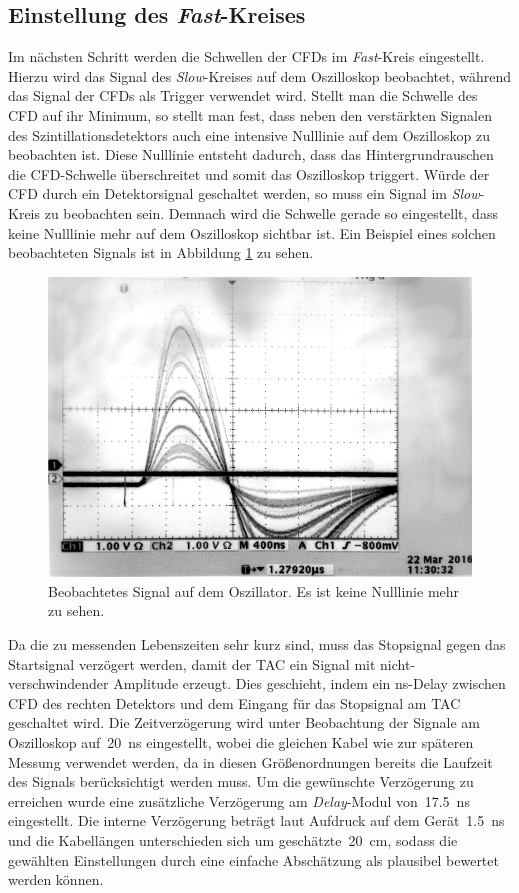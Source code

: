 \documentclass[11pt, a4paper]{article}
\numberwithin{equation}{section}
\begin{document}
\subsection{Einstellung des \textit{Fast}-Kreises}
\label{ssec:fastkreis}
Im nächsten Schritt werden die Schwellen der CFDs im \textit{Fast}-Kreis eingestellt.
Hierzu wird das Signal des \textit{Slow}-Kreises auf dem Oszilloskop beobachtet, während das Signal der CFDs als Trigger verwendet wird.
Stellt man die Schwelle des CFD auf ihr Minimum, so stellt man fest, dass neben den verstärkten Signalen des Szintillationsdetektors auch eine intensive Nulllinie auf dem Oszilloskop zu beobachten ist.
Diese Nulllinie entsteht dadurch, dass das Hintergrundrauschen die CFD-Schwelle überschreitet und somit das Oszilloskop triggert.
Würde der CFD durch ein Detektorsignal geschaltet werden, so muss ein Signal im \textit{Slow}-Kreis zu beobachten sein.
Demnach wird die Schwelle gerade so eingestellt, dass keine Nulllinie mehr auf dem Oszilloskop sichtbar ist.
Ein Beispiel eines solchen beobachteten Signals ist in Abbildung \ref{fig:cfd_threshold} zu sehen.
\begin{figure}[htbp]
	\centering
	\includegraphics[width=.8\textwidth]{./figures/cfd_threshold}
	\caption{Beobachtetes Signal auf dem Oszillator. Es ist keine Nulllinie mehr zu sehen.}
	\label{fig:cfd_threshold}
\end{figure}

Da die zu messenden Lebenszeiten sehr kurz sind, muss das Stopsignal gegen das Startsignal verzögert werden, damit der TAC ein Signal mit nicht-verschwindender Amplitude erzeugt.
Dies geschieht, indem ein \si{ns}-Delay zwischen CFD des rechten Detektors und dem Eingang für das Stopsignal am TAC geschaltet wird.
Die Zeitverzögerung wird unter Beobachtung der Signale am Oszilloskop auf~\SI{20}{ns} eingestellt, wobei die gleichen Kabel wie zur späteren Messung verwendet werden, da in diesen Größenordnungen bereits die Laufzeit des Signals berücksichtigt werden muss.
Um die gewünschte Verzögerung zu erreichen wurde eine zusätzliche Verzögerung am \textit{Delay}-Modul von~\SI{17.5}{ns} eingestellt.
Die interne Verzögerung beträgt laut Aufdruck auf dem Gerät~\SI{1.5}{ns} und die Kabellängen unterschieden sich um geschätzte~\SI{20}{cm}, sodass die gewählten Einstellungen durch eine einfache Abschätzung als plausibel bewertet werden können.
\end{document}
